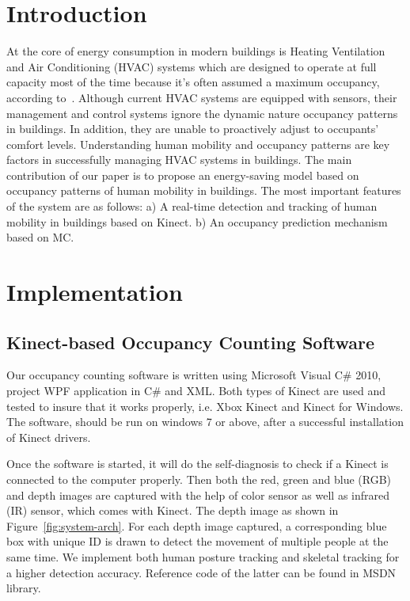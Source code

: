 \documentclass{sig-alternate}
\begin{document}
\section{Introduction}
\label{sec:introduction}
At the core of energy consumption in
modern buildings is Heating Ventilation and Air Conditioning (HVAC)
systems which are designed to operate at full capacity most of the
time because it's often assumed a maximum occupancy, according
to~\cite{ref:Wang2011}. Although current HVAC systems are equipped with sensors, their management and control
systems ignore the dynamic nature occupancy patterns in buildings. In
addition, they are unable to proactively adjust to occupants' comfort
levels. Understanding human mobility and occupancy patterns are key
factors in successfully managing HVAC systems in buildings. The main
contribution of our paper is to propose an energy-saving model based
on occupancy patterns of human mobility in buildings. The most
important features of the system are as follows: a) A real-time
detection and tracking of human mobility in buildings based on
Kinect. b) An occupancy prediction mechanism based on MC. 
\par






\section{Implementation}
\label{sec:implementation}

\subsection{Kinect-based Occupancy Counting Software}
Our occupancy counting software is written using Microsoft Visual
C\# 2010, project WPF application in C\# and XML\@. Both types of
Kinect are used and tested to insure that it works properly, i.e. Xbox
Kinect and Kinect for Windows. The software, should be run on windows
7 or above, after a successful installation of Kinect drivers.    
\par

Once the software is started, it will do the self-diagnosis to check
if a Kinect is connected to the computer properly. Then both the red,
green and blue (RGB) and depth images are captured with the help of
color sensor as well as infrared (IR) sensor, which comes with
Kinect. The depth image as shown in Figure~\ref{fig:system-arch}. For
each depth image captured, a corresponding blue box with unique ID is
drawn to detect the movement of multiple people at the same time. We
implement both human posture tracking and skeletal tracking for a
higher detection accuracy. Reference code of the latter can be found
in MSDN library.
\end{document}
